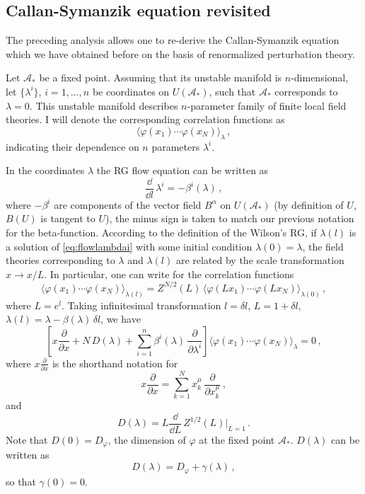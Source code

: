 \subsection*{Callan-Symanzik equation revisited}

The preceding analysis allows one to re-derive the Callan-Symanzik equation which
we have obtained before on the basis of renormalized perturbation theory.

Let $\mathcal A_*$ be a fixed point. Assuming that its unstable manifold is
$n$-dimensional, let $\{\lambda^i\}$, $i=1,\dots,n$ be coordinates on
$U(\mathcal A_*)$, such that $\mathcal A_*$ corresponds to $\lambda=0$. This
unstable manifold describes $n$-parameter family of finite local field theories. I
will denote the corresponding correlation functions as
\[
\bigl\langle\varphi(x_1)\cdots\varphi(x_N)\bigr\rangle_\lambda\,,
\]
indicating their dependence on $n$ parameters $\lambda^i$.

In the coordinates $\lambda$ the RG flow equation can be written as
\begin{equation}\label{eq:flowlambdai}
\frac{\dd}{\dd l}\,\lambda^i=-\beta^i(\lambda)\,,
\end{equation}
where $-\beta^i$ are components of the vector field $B^\alpha$ on
$U(\mathcal A_*)$ (by definition of $U$, $B(U)$ is tangent to $U$), the minus sign
is taken to match our previous notation for the beta-function. According to the
definition of the Wilson's RG, if $\lambda(l)$ is a solution of
\eqref{eq:flowlambdai} with some initial condition $\lambda(0)=\lambda$, the field
theories corresponding to $\lambda$ and $\lambda(l)$ are related by the scale
transformation $x\to x/L$. In particular, one can write for the correlation
functions
\[
\bigl\langle\varphi(x_1)\cdots\varphi(x_N)\bigr\rangle_{\lambda(l)}=Z^{N/2}(L)\,\bigl\langle\varphi(Lx_1)\cdots\varphi(Lx_N)\bigr\rangle_{\lambda(0)}\,,
\]
where $L=e^l$. Taking infinitesimal transformation $l=\delta l$, $L=1+\delta l$,
$\lambda(l)=\lambda-\beta(\lambda)\,\delta l$, we have
\begin{equation}\label{eq:CSgeneral}
\left[x\frac\partial{\partial x}+N\,D(\lambda)+\sum_{i=1}^n\beta^i(\lambda)\,\frac\partial{\partial\lambda^i}\right]\bigl\langle\varphi(x_1)\cdots\varphi(x_N)\bigr\rangle_\lambda=0\,,
\end{equation}
where $x\frac\partial{\partial x}$ is the shorthand notation for
\[
x\frac\partial{\partial x}=\sum_{k=1}^Nx_k^\mu\,\frac\partial{\partial x_k^\mu}\,,
\]
and
\[
D(\lambda)=L\frac{\dd}{\dd L}\,Z^{1/2}(L)\Big|_{L=1}\,.
\]
Note that $D(0)=D_\varphi$, the dimension of $\varphi$ at the fixed point
$\mathcal A_*$. $D(\lambda)$ can be written as
\[
D(\lambda)=D_\varphi+\gamma(\lambda)\,,
\]
so that $\gamma(0)=0$.

